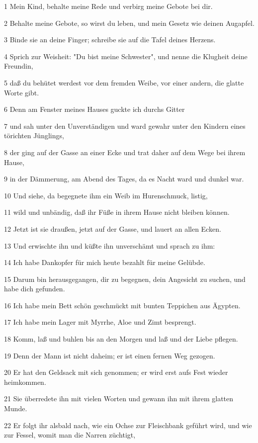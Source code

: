 \par 1 Mein Kind, behalte meine Rede und verbirg meine Gebote bei dir.
\par 2 Behalte meine Gebote, so wirst du leben, und mein Gesetz wie deinen Augapfel.
\par 3 Binde sie an deine Finger; schreibe sie auf die Tafel deines Herzens.
\par 4 Sprich zur Weisheit: "Du bist meine Schwester", und nenne die Klugheit deine Freundin,
\par 5 daß du behütet werdest vor dem fremden Weibe, vor einer andern, die glatte Worte gibt.
\par 6 Denn am Fenster meines Hauses guckte ich durchs Gitter
\par 7 und sah unter den Unverständigen und ward gewahr unter den Kindern eines törichten Jünglings,
\par 8 der ging auf der Gasse an einer Ecke und trat daher auf dem Wege bei ihrem Hause,
\par 9 in der Dämmerung, am Abend des Tages, da es Nacht ward und dunkel war.
\par 10 Und siehe, da begegnete ihm ein Weib im Hurenschmuck, listig,
\par 11 wild und unbändig, daß ihr Füße in ihrem Hause nicht bleiben können.
\par 12 Jetzt ist sie draußen, jetzt auf der Gasse, und lauert an allen Ecken.
\par 13 Und erwischte ihn und küßte ihn unverschämt und sprach zu ihm:
\par 14 Ich habe Dankopfer für mich heute bezahlt für meine Gelübde.
\par 15 Darum bin herausgegangen, dir zu begegnen, dein Angesicht zu suchen, und habe dich gefunden.
\par 16 Ich habe mein Bett schön geschmückt mit bunten Teppichen aus Ägypten.
\par 17 Ich habe mein Lager mit Myrrhe, Aloe und Zimt besprengt.
\par 18 Komm, laß und buhlen bis an den Morgen und laß und der Liebe pflegen.
\par 19 Denn der Mann ist nicht daheim; er ist einen fernen Weg gezogen.
\par 20 Er hat den Geldsack mit sich genommen; er wird erst aufs Fest wieder heimkommen.
\par 21 Sie überredete ihn mit vielen Worten und gewann ihn mit ihrem glatten Munde.
\par 22 Er folgt ihr alsbald nach, wie ein Ochse zur Fleischbank geführt wird, und wie zur Fessel, womit man die Narren züchtigt,
